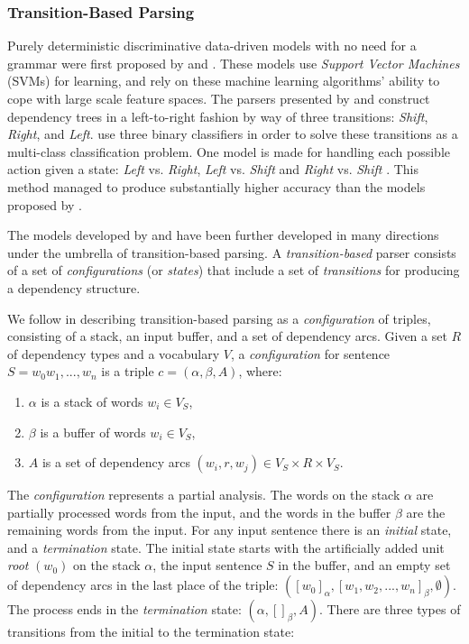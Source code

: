 \subsubsection{Transition-Based Parsing}

Purely deterministic discriminative data-driven models with no need for a grammar were first proposed by  and . These models use \textit{Support Vector Machines} (SVMs) for learning, and rely on these machine learning algorithms' ability to cope with large scale feature spaces. The parsers presented by \citeauthor{Kudo:00} and \citeauthor{Yamada:03} construct dependency trees in a left-to-right fashion by way of three transitions: \textit{Shift}, \textit{Right}, and \textit{Left}. \citeauthor{Yamada:03} use three binary classifiers in order to solve these transitions as a multi-class classification problem. One model is made for handling each possible action given a state: \textit{Left} vs. \textit{Right}, \textit{Left} vs. \textit{Shift} and \textit{Right} vs. \textit{Shift} \cite{Yamada:03}. This method managed to produce substantially higher accuracy than the models proposed by .

The models developed by \citeauthor{Kudo:00} and \citeauthor{Yamada:03} have been further developed in many directions under the umbrella of transition-based parsing. A \textit{transition-based} parser consists of a set of \textit{configurations} (or \textit{states}) that include a set of \textit{transitions} for producing a dependency structure.

We follow  in describing transition-based parsing as a \textit{configuration} of triples, consisting of a stack, an input buffer, and a set of dependency arcs. Given a set $R$ of dependency types and a vocabulary $V$, a \textit{configuration} for sentence $S = w_0w_1, ..., w_n$ is a triple $c = (\alpha, \beta, A)$, where:

\begin{enumerate}
\item $\alpha$ is a stack of words $w_i \in V_S$,
\item $\beta$ is a buffer of words $w_i \in V_S$,
\item $A$ is a set of dependency arcs $(w_i, r, w_j) \in V_S \times R \times V_S$.
\end{enumerate}

The \textit{configuration} represents a partial analysis. The words on the stack $\alpha$ are partially processed words from the input, and the words in the buffer $\beta$ are the remaining words from the input. For any input sentence there is an \textit{initial} state, and a \textit{termination} state. The initial state starts with the artificially added unit \textit{root} $(w_0)$ on the stack $\alpha$, the input sentence $S$ in the buffer, and an empty set of dependency arcs in the last place of the triple: $([w_0]_\alpha, [w_1, w_2, ..., w_n]_\beta, \emptyset)$. The process ends in the \textit{termination} state: $(\alpha, []_\beta, A)$. There are three types of transitions from the initial to the termination state:

